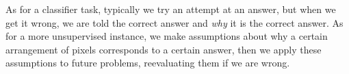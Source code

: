 \documentclass{article}
\begin{document}
As for a classifier task, typically we try an attempt at an answer, but when we get it wrong, we are told the correct answer and \textit{why} it is the correct answer. As for a more unsupervised instance, we make assumptions about why a certain arrangement of pixels corresponds to a certain answer, then we apply these assumptions to future problems, reevaluating them if we are wrong. 
\end{document}
